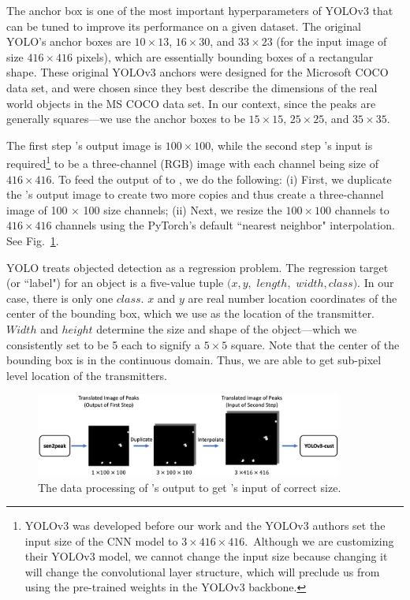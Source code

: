 The anchor box is one of the most important hyperparameters of YOLOv3 that can be tuned to improve
its performance on a given dataset.  The original YOLO's anchor boxes are $10\times13$,  $16\times30$, and $33\times23$ (for
the input image of size $416\times416$ pixels), which are essentially bounding boxes of a rectangular shape. 
These original YOLOv3 anchors were designed for the Microsoft COCO \cite{mscoco} data set, and were chosen
since they best describe the dimensions of the real world objects in the MS COCO data set. In our context,
since the peaks are generally squares---we use the anchor boxes to be $15\times15$, $25\times25$, and $35\times35$.


The first step \imgimg's output image is $100\times100$, while the second step \yolocust's input is required\footnote{YOLOv3 was developed before our work and the YOLOv3 authors set the input size of the CNN model to $3\times416\times416$.~Although we are customizing their YOLOv3 model, we cannot change the input size because changing it will change the convolutional layer structure, which will 
preclude us from using the pre-trained weights in the YOLOv3 backbone.} 
to be a three-channel (RGB) image with each channel being size of $416\times 416$. 
To feed the output of \imgimg to \yolocust, we do the following: (i) First, we duplicate 
the \imgimg's output image to create two more copies and thus create a three-channel image
of 100 $\times$ 100 size channels; (ii) Next, we resize the $100\times100$ channels to $416\times416$ channels using the PyTorch's default ``nearest neighbor" interpolation. See Fig.~\ref{fig:yolo-preprocess}.

YOLO treats objected detection as a regression problem. The regression target (or ``label") for an object is a five-value tuple $(x, y,$ $length,$ $width, class)$. 
In our case, there is only one $class$. 
$x$ and $y$ are real number location coordinates of the center of the bounding box, which we use as the location of the transmitter. 
$Width$ and $height$ determine the size and shape of the object---which we consistently set to be 5 each to signify a $5\times5$ square. 
Note that the center of the bounding box is in the continuous domain. 
Thus, we are able to get sub-pixel level location of the transmitters.


\begin{figure}[t]
	\centering
	\includegraphics[width=0.9\textwidth]{chapters/wowmom-pmc/figures/yolo-preprocess.png}
	\caption{The data processing of \imgimg's output to get \yolocust's input of correct size.}
	\label{fig:yolo-preprocess}
\end{figure}


